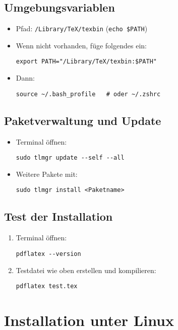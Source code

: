 \subsection{Umgebungsvariablen}
\begin{itemize}
    \item Pfad: \texttt{/Library/TeX/texbin} (\texttt{echo \$PATH})
    \item Wenn nicht vorhanden, füge folgendes ein:
    \begin{verbatim}
export PATH="/Library/TeX/texbin:$PATH"
    \end{verbatim}
    \item Dann:
    \begin{verbatim}
source ~/.bash_profile   # oder ~/.zshrc
    \end{verbatim}
\end{itemize}

\subsection{Paketverwaltung und Update}
\begin{itemize}
    \item Terminal öffnen:
    \begin{verbatim}
sudo tlmgr update --self --all
    \end{verbatim}
    \item Weitere Pakete mit:
    \begin{verbatim}
sudo tlmgr install <Paketname>
    \end{verbatim}
\end{itemize}

\subsection{Test der Installation}
\begin{enumerate}
    \item Terminal öffnen:
    \begin{verbatim}
pdflatex --version
    \end{verbatim}
    \item Testdatei wie oben erstellen und kompilieren:
    \begin{verbatim}
pdflatex test.tex
    \end{verbatim}
\end{enumerate}

\section{Installation unter Linux}


